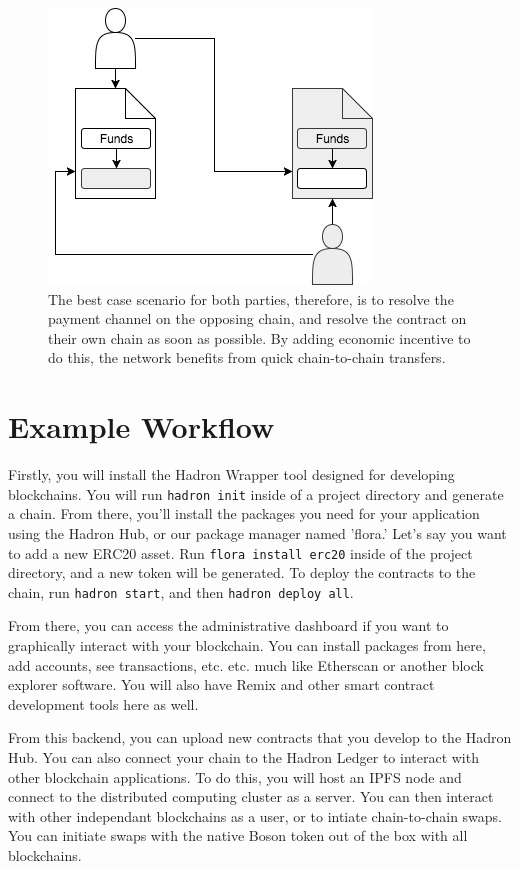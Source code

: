 \documentclass{%
	article}
\begin{document}
\begin{figure}[H]
\centering
\includegraphics[scale=0.5]{fig6.jpg}
\caption{\small\textnormal{The best case scenario for both parties, therefore, is to resolve the payment channel on the opposing chain, and resolve the contract on their own chain as soon as possible. By adding economic incentive to do this, the network benefits from quick chain-to-chain transfers.}}
\end{figure}

\section{Example Workflow}
Firstly, you will install the Hadron Wrapper tool designed for developing blockchains. You will run \texttt{hadron init} inside of a project directory and generate a chain. From there, you'll install the packages you need for your application using the Hadron Hub, or our package manager named 'flora.' Let's say you want to add a new ERC20 asset. Run \texttt{flora install erc20} inside of the project directory, and a new token will be generated. To deploy the contracts to the chain, run \texttt{hadron start}, and then \texttt{hadron deploy all}.

From there, you can access the administrative dashboard if you want to graphically interact with your blockchain. You can install packages from here, add accounts, see transactions, etc. etc. much like Etherscan or another block explorer software. You will also have Remix and other smart contract development tools here as well.

From this backend, you can upload new contracts that you develop to the Hadron Hub. You can also connect your chain to the Hadron Ledger to interact with other blockchain applications. To do this, you will host an IPFS node and connect to the distributed computing cluster as a server. You can then interact with other independant blockchains as a user, or to intiate chain-to-chain swaps. You can initiate swaps with the native Boson token out of the box with all blockchains.
\end{document}
